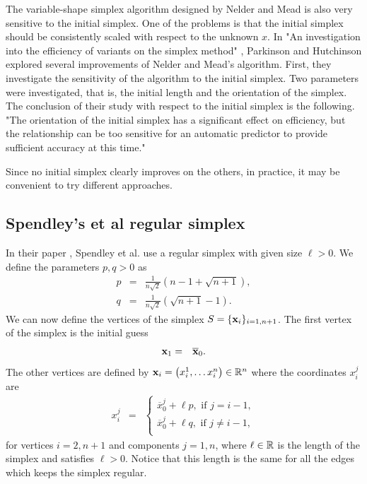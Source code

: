 The variable-shape simplex algorithm designed by Nelder and Mead is also very
sensitive to the initial simplex.
One of the problems is that the initial simplex should be consistently scaled 
with respect to the unknown $x$.
In "An investigation into the efficiency of variants on the simplex method" \cite{parkinson1972}, 
Parkinson and Hutchinson explored 
several improvements of Nelder and Mead's algorithm. First, they investigate the sensitivity
of the algorithm to the initial simplex. Two parameters were investigated,
that is, the initial length and the orientation of the simplex. 
The conclusion of their study with respect to the initial simplex is 
the following. "The orientation of the initial simplex has a significant effect 
on efficiency, but the relationship can be too sensitive for an automatic 
predictor to provide sufficient accuracy at this time."

Since no initial simplex clearly improves on the others, in practice, 
it may be convenient to try different approaches.

\subsection{Spendley's et al regular simplex}

In their paper \cite{Spendley1962}, Spendley et al. use a regular 
simplex with given size $\ell>0$. We define the parameters $p,q>0$ as 
\begin{eqnarray}
p &=& \frac{1}{n\sqrt{2}} \left(n-1 + \sqrt{n+1}\right), \\
q &=& \frac{1}{n\sqrt{2}} \left(\sqrt{n+1} - 1\right).
\end{eqnarray}
We can now define the vertices of the simplex $S=\{\mathbf{x}_i\}_{i=1,n+1}$.
The first vertex of the simplex is the initial guess 
\begin{eqnarray}
\mathbf{x}_1 &=& \overline{\mathbf{x}}_0.
\end{eqnarray}
The other vertices are defined by $\mathbf{x}_i = \left( x_i^1, \ldots x_i^n\right)\in\mathbb{R}^n$
where the coordinates $x_i^j$ are 
\begin{eqnarray}
x_i^j &=& 
\left\{
\begin{array}{l}
\overline{x}_0^j + \ell p, \textrm{ if } j=i-1,\\
\overline{x}_0^j + \ell q, \textrm{ if } j\neq i-1,\\
\end{array}
\right.
\end{eqnarray}
for vertices $i=2,n+1$ and components $j=1,n$, 
where $\ell \in\mathbb{R}$ is the length of the simplex and satisfies $\ell>0$. Notice that this 
length is the same for all the edges which keeps the simplex regular.


